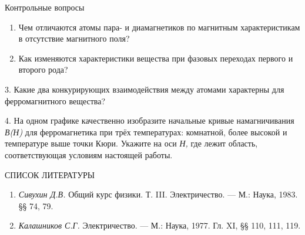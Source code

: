 \documentclass[]{article}
\begin{document}
Контрольные вопросы

\begin{enumerate}
\def\labelenumi{\arabic{enumi}.}
\item
  Чем отличаются атомы пара- и диамагнетиков по магнитным
  характери­стикам в отсутствие магнитного поля?
\item
  Как изменяются характеристики вещества при фазовых переходах первого и
  второго рода?
\end{enumerate}

3. Какие два конкурирующих взаимодействия между атомами характерны для
ферромагнитного вещества?

4. На одном графике качественно изобразите начальные кривые
намагничи­вания \emph{В(Н)} для ферромагнетика при трёх температурах:
комнатной, более высокой и температуре выше точки Кюри. Укажите на оси
\emph{Н,} где лежит область, соответствующая условиям настоящей работы.

СПИСОК ЛИТЕРАТУРЫ

\begin{enumerate}
\def\labelenumi{\arabic{enumi}.}
\item
  \emph{Сивухин Д.В.} Общий курс физики. Т. III. Электричество. --- М.:
  Наука, 1983. §§ 74, 79.
\item
  \emph{Калашников С.Г.} Электричество. --- М.: Наука, 1977. Гл. XI, §§
  110, 111, 119.
\end{enumerate}
\end{document}
